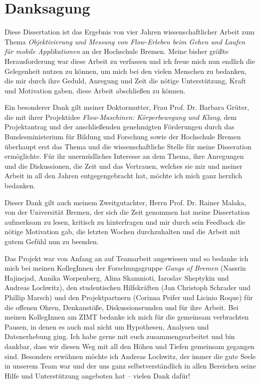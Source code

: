 \section*{Danksagung}

Diese Dissertation ist das Ergebnis von vier Jahren wissenschaftlicher Arbeit zum Thema \emph{Objektivierung und Messung von Flow-Erleben beim Gehen und Laufen für mobile Applikationen} an der Hochschule Bremen. Meine bisher größte Herausforderung war diese Arbeit zu verfassen und ich freue mich nun endlich die Gelegenheit nutzen zu können, um mich bei den vielen Menschen zu bedanken, die mir durch ihre Geduld, Anregung und Zeit die nötige Unterstützung, Kraft und Motivation gaben, diese Arbeit abschließen zu können.

Ein besonderer Dank gilt meiner Doktormutter, Frau Prof. Dr. Barbara Grüter, die mit ihrer Projektidee \emph{Flow-Maschinen: Körperbewegung und Klang}, dem Projektantrag und der anschließenden genehmigten Förderungen durch das Bundesministerium für Bildung und Forschung sowie der Hochschule Bremen überhaupt erst das Thema und die wissenschaftliche Stelle für meine Disseration ermöglichte. Für ihr unermüdliches Interesse an dem Thema, ihre Anregungen und die Diskussionen, die Zeit und das Vertrauen, welches sie mir und meiner Arbeit in all den Jahren entgegengebracht hat, möchte ich mich ganz herzlich bedanken.

Dieser Dank gilt auch meinem Zweitgutachter, Herrn Prof. Dr. Rainer Malaka, von der Universität Bremen, der sich die Zeit genommen hat meine Dissertation aufmerksam zu lesen, kritisch zu hinterfragen und mir durch sein Feedback die nötige Motivation gab, die letzten Wochen durchzuhalten und die Arbeit mit gutem Gefühl nun zu beenden.

Das Projekt war von Anfang an auf Teamarbeit angewiesen und so bedanke ich mich bei meinen KollegInnen der Forschungsgruppe \emph{Gangs of Bremen} (Nassrin Hajinejad, Annika Worpenberg, Alina Skamnioti, Iaroslav Sheptykin und Andreas Lochwitz), den studentischen Hilfskräften (Jan Christoph Schrader und Phillip Marsch) und den Projektpartnern (Corinna Peifer und Licinio Roque) für die offenen Ohren, Denkanstöße, Diskussionsrunden und für ihre Arbeit. Bei meinen KollegInnen am ZIMT bedanke ich mich für die gemeinsam verbrachten Pausen, in denen es auch mal nicht um Hypothesen, Analysen und Datenerhebung ging. Ich habe gerne mit euch zusammengearbeitet und bin dankbar, dass wir diesen Weg mit all den Höhen und Tiefen gemeinsam gegangen sind. Besonders erwähnen möchte ich Andreas Lochwitz, der immer die gute Seele in unserem Team war und der uns ganz selbstverständlich in allen Bereichen seine Hilfe und Unterstützung angeboten hat -- vielen Dank dafür! 

